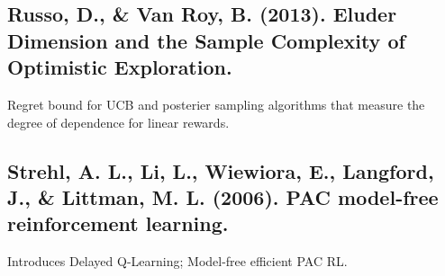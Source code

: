 \documentclass[12pt, oneside]{amsart}
\begin{document}
	\subsection*{Russo, D., \& Van Roy, B. (2013). Eluder Dimension and the Sample Complexity of Optimistic Exploration.}
	Regret bound for UCB and posterier sampling algorithms that measure the degree of dependence for linear rewards.
	
	\subsection*{Strehl, A. L., Li, L., Wiewiora, E., Langford, J., \& Littman, M. L. (2006). PAC model-free reinforcement learning.}
	Introduces Delayed Q-Learning; Model-free efficient PAC RL.
	
\end{document}

